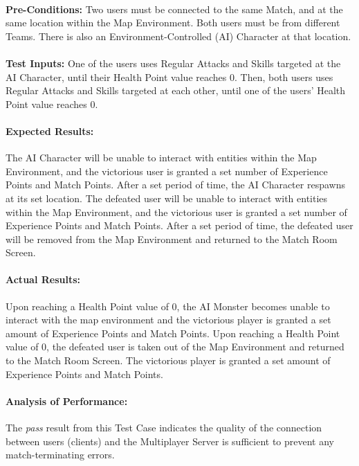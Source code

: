 \documentclass{article}
\begin{document}
    \paragraph{}\textbf{Pre-Conditions:} Two users must be connected to the same Match, and at the same location within the Map Environment. Both users must be from different Teams. There is also an Environment-Controlled (AI) Character at that location.
    \paragraph{}\textbf{Test Inputs:} One of the users uses Regular Attacks and Skills targeted at the AI Character, until their Health Point value reaches 0. Then, both users uses Regular Attacks and Skills targeted at each other, until one of the users' Health Point value reaches 0.
    \paragraph{Expected Results:} The AI Character will be unable to interact with entities within the Map Environment, and the victorious user is granted a set number of Experience Points and Match Points. After a set period of time, the AI Character respawns at its set location. The defeated user will be unable to interact with entities within the Map Environment, and the victorious user is granted a set number of Experience Points and Match Points. After a set period of time, the defeated user will be removed from the Map Environment and returned to the Match Room Screen.
    \paragraph{Actual Results:} Upon reaching a Health Point value of 0, the AI Monster becomes unable to interact with the map environment and the victorious player is granted a set amount of Experience Points and Match Points. Upon reaching a Health Point value of 0, the defeated user is taken out of the Map Environment and returned to the Match Room Screen. The victorious player is granted a set amount of Experience Points and Match Points.
    \paragraph{Analysis of Performance:} The \emph{pass} result from this Test Case indicates the quality of the connection between users (clients) and the Multiplayer Server is sufficient to prevent any match-terminating errors.
\end{document}
